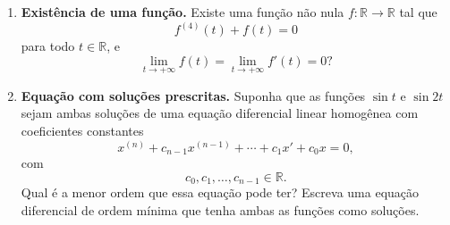 \documentclass[a4paper,11pt,reqno]{amsart}
\begin{document}
\begin{enumerate}
Considere $C^n=C^n(I,\mathbb{R})$, ou $C^n(I,\mathbb{C})$, o espaço vetorial das funções reais, ou complexas, de classe $C^n$ em $I$.

Prove que:

\begin{enumerate}
    \item O conjunto das soluções de $(*)$ é um subespaço vetorial de $C^n$ de dimensão $n$.

    \emph{Sugestão:} escreva $x_1=x$, $x_2=x'$, \ldots, $x_n=x^{(n-1)}$, e verifique que $(*)$ é equivalente a um sistema linear da forma
    \[
        X'=A(t)X.
    \]

    \item Sejam $\varphi_1,\ldots,\varphi_n\in C^n$ soluções de $(*)$ e seja
    \[
        W(t)=W(\varphi_1,\ldots,\varphi_n)(t)
    \]
    o determinante da matriz $n\times n$ cuja $i$-ésima linha é formada por
    \[
        \frac{d^{i-1}\varphi_1}{dt^{i-1}},
        \ldots,
        \frac{d^{i-1}\varphi_n}{dt^{i-1}},
    \]
    para $i=1,\ldots,n$. Prove que
    \[
        W(t)=W(t_0)\exp\left(\int_{t_0}^t a_{n-1}(s)\,ds\right).
    \]
    Conclua que $n$ soluções $\varphi_1,\ldots,\varphi_n$ são linearmente independentes se, e somente se,
    \[
        W(\varphi_1,\ldots,\varphi_n)(t)\neq 0
        \qquad\text{para todo }t\in I.
    \]

    \item Sejam $\varphi_1,\ldots,\varphi_n\in C^n$ tais que
    \[
        W(\varphi_1,\ldots,\varphi_n)(t)\neq 0
        \qquad\text{em }I.
    \]
    Prove que existe uma única equação da forma $(*)$ que tem $\{\varphi_1,\ldots,\varphi_n\}$ como base do espaço de soluções.
\end{enumerate}


\item \textbf{Existência de uma função.}
Existe uma função não nula $f:\mathbb{R}\to\mathbb{R}$ tal que
\[
    f^{(4)}(t)+f(t)=0
\]
para todo $t\in\mathbb{R}$, e
\[
    \lim_{t\to+\infty}f(t)
    =
    \lim_{t\to+\infty}f'(t)
    =
    0?
\]


\item \textbf{Equação com soluções prescritas.}
Suponha que as funções $\sin t$ e $\sin 2t$ sejam ambas soluções de uma equação diferencial linear homogênea com coeficientes constantes
\[
    x^{(n)}+c_{n-1}x^{(n-1)}+\cdots+c_1x'+c_0x=0,
\]
com
\[
    c_0,c_1,\ldots,c_{n-1}\in\mathbb{R}.
\]
Qual é a menor ordem que essa equação pode ter? Escreva uma equação diferencial de ordem mínima que tenha ambas as funções como soluções.



\end{enumerate}
\end{document}
